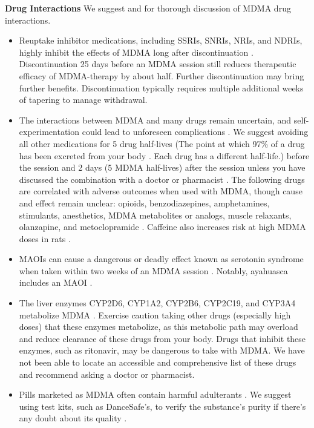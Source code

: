 \documentclass[12pt,letterpaper]{article}
\begin{document}
\noindent \textbf{Drug Interactions} We suggest \textcite{papaseitInteractions} and \textcite{sarparastDrugInteractions} for thorough discussion of MDMA drug interactions.
\begin{itemize}
    \item Reuptake inhibitor medications, including SSRIs, SNRIs, NRIs, and NDRIs, highly inhibit the effects of MDMA long after discontinuation \cite{feducciaSSRIDiscontinuation}. Discontinuation 25 days before an MDMA session still reduces therapeutic efficacy of MDMA-therapy by about half. Further discontinuation may bring further benefits. Discontinuation typically requires multiple additional weeks of tapering to manage withdrawal.
    \item The interactions between MDMA and many drugs remain uncertain, and self-experimentation could lead to unforeseen complications \cite{cohenMDMADrugCombinations,sarparastDrugInteractions}. We suggest avoiding all other medications for 5 drug half-lives (The point at which 97\% of a drug has been excreted from your body . Each drug has a different half-life.) before the session and 2 days (5 MDMA half-lives) after the session unless you have discussed the combination with a doctor or pharmacist \cite{andradeHalf,torrePharmacology}. The following drugs are correlated with adverse outcomes when used with MDMA, though cause and effect remain unclear: opioids, benzodiazepines, amphetamines, stimulants, anesthetics, MDMA metabolites or analogs, muscle relaxants, olanzapine, and metoclopramide \cite{cohenMDMADrugCombinations}. Caffeine also increases risk at high MDMA doses in rats \cite{vanattouCaffeine}.
    \item MAOIs can cause a dangerous or deadly effect known as serotonin syndrome when taken within two weeks of an MDMA session \cite{malcolmSerotonin,edinoffInteractions}. Notably, ayahuasca includes an MAOI \cite{ruffell2020pharmacological}.
    \item The liver enzymes CYP2D6, CYP1A2, CYP2B6, CYP2C19, and CYP3A4 metabolize MDMA \cite{torreEnzymes,sarparastDrugInteractions}. Exercise caution taking other drugs (especially high doses) that these enzymes metabolize, as this metabolic path may overload and reduce clearance of these drugs from your body. Drugs that inhibit these enzymes, such as ritonavir, may be dangerous to take with MDMA. We have not been able to locate an accessible and comprehensive list of these drugs and recommend asking a doctor or pharmacist.
    \item Pills marketed as MDMA often contain harmful adulterants \cite{saleemiAdulterants}. We suggest using test kits, such as DanceSafe's, to verify the substance's purity if there's any doubt about its quality \cite{danceSafeTestingKit}.
\end{itemize}
\end{document}
